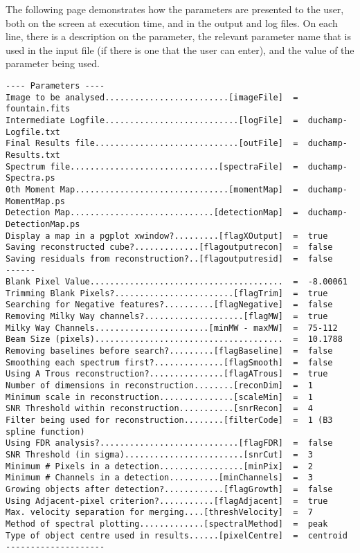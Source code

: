The following page demonstrates how the parameters are presented to
the user, both on the screen at execution time, and in the output and
log files. On each line, there is a description on the parameter, the
relevant parameter name that is used in the input file (if there is
one that the user can enter), and the value of the parameter being
used.

%
{\scriptsize
\begin{verbatim}
---- Parameters ----
Image to be analysed.........................[imageFile]  =  fountain.fits
Intermediate Logfile...........................[logFile]  =  duchamp-Logfile.txt
Final Results file.............................[outFile]  =  duchamp-Results.txt
Spectrum file..............................[spectraFile]  =  duchamp-Spectra.ps
0th Moment Map...............................[momentMap]  =  duchamp-MomentMap.ps
Detection Map.............................[detectionMap]  =  duchamp-DetectionMap.ps
Display a map in a pgplot xwindow?.........[flagXOutput]  =  true
Saving reconstructed cube?.............[flagoutputrecon]  =  false
Saving residuals from reconstruction?..[flagoutputresid]  =  false
------
Blank Pixel Value.......................................  =  -8.00061
Trimming Blank Pixels?........................[flagTrim]  =  true
Searching for Negative features?..........[flagNegative]  =  false
Removing Milky Way channels?....................[flagMW]  =  true
Milky Way Channels.......................[minMW - maxMW]  =  75-112
Beam Size (pixels)......................................  =  10.1788
Removing baselines before search?.........[flagBaseline]  =  false
Smoothing each spectrum first?..............[flagSmooth]  =  false
Using A Trous reconstruction?...............[flagATrous]  =  true
Number of dimensions in reconstruction........[reconDim]  =  1
Minimum scale in reconstruction...............[scaleMin]  =  1
SNR Threshold within reconstruction...........[snrRecon]  =  4
Filter being used for reconstruction........[filterCode]  =  1 (B3 spline function)
Using FDR analysis?............................[flagFDR]  =  false
SNR Threshold (in sigma)........................[snrCut]  =  3
Minimum # Pixels in a detection.................[minPix]  =  2
Minimum # Channels in a detection..........[minChannels]  =  3
Growing objects after detection?............[flagGrowth]  =  false
Using Adjacent-pixel criterion?...........[flagAdjacent]  =  true
Max. velocity separation for merging....[threshVelocity]  =  7
Method of spectral plotting.............[spectralMethod]  =  peak
Type of object centre used in results......[pixelCentre]  =  centroid
--------------------
\end{verbatim}
}
